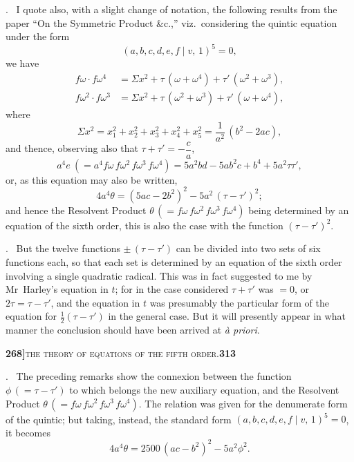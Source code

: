 \documentclass[11pt]{article}
\newcommand{\Cdel}{\mid}
\begin{document}
. \ I quote also, with a slight change of notation, the following results from the paper ``On the Symmetric Product \&c.,'' viz.\ considering the quintic equation under the form
\[
   (a, b, c, d, e, f\Cdel v,\,1)^5 = 0,
\]
we have
\[
\begin{aligned}
   f\omega\cdot f\omega^4 &= \Sigma x^2 + \tau\,(\omega + \omega^4) + \tau'\,(\omega^2 + \omega^3),\\
   f\omega^2\cdot f\omega^3 &= \Sigma x^2 + \tau\,(\omega^2 + \omega^3) + \tau'\,(\omega + \omega^4),
\end{aligned}
\]
where
\[
   \Sigma x^2 = x_1^2 + x_2^2 + x_3^2 + x_4^2 + x_5^2 = \frac{1}{a^2}\,(b^2 - 2 a c),
\]
and thence, observing also that $\tau + \tau' = -\dfrac{c}{a}$,
\[
   a^4 e\ (= a^4 f\omega\,f\omega^2\,f\omega^3\,f\omega^4) = 5 a^2 b d - 5 a b^2 c + b^4 + 5 a^2 \tau\tau',
\]
or, as this equation may also be written,
\[
   4 a^4 \theta = (5 a c - 2 b^2)^2 - 5 a^2\,(\tau - \tau')^2;
\]
and hence the Resolvent Product $\theta\,(= f\omega\,f\omega^2\,f\omega^3\,f\omega^4)$ being determined by an equation of the sixth order, this is also the case with the function $(\tau - \tau')^2$.

\medskip

. \ But the twelve functions $\pm\,(\tau - \tau')$ can be divided into two sets of six functions each, so that each set is determined by an equation of the sixth order involving a single quadratic radical. This was in fact suggested to me by Mr~Harley's equation in $t$; for in the case considered $\tau + \tau'$ was $= 0$, or $2\tau = \tau - \tau'$, and the equation in $t$ was presumably the particular form of the equation for $\tfrac{1}{2}(\tau - \tau')$ in the general case. But it will presently appear in what manner the conclusion should have been arrived at \textit{\`a priori}.

\newpage
\setcounter{page}{313}

\noindent\textbf{268]}\hfill\textsc{the theory of equations of the fifth order.}\hfill\textbf{313}

\medskip

. \ The preceding remarks show the connexion between the function $\phi\,(= \tau - \tau')$ to which belongs the new auxiliary equation, and the Resolvent Product $\theta\,(= f\omega\,f\omega^2\,f\omega^3\,f\omega^4)$. The relation was given for the denumerate form of the quintic; but taking, instead, the standard form $(a, b, c, d, e, f\Cdel v,\,1)^5 = 0$, it becomes
\[
   4 a^4 \theta = 2500\,(a c - b^2)^2 - 5 a^2\phi^2.
\]
\end{document}
